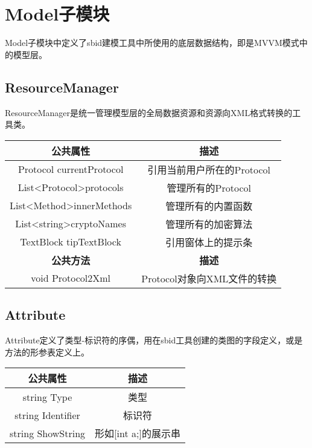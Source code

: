 \chapter{Model子模块}
Model子模块中定义了sbid建模工具中所使用的底层数据结构，即是MVVM模式中的模型层。
\section{ResourceManager}
ResourceManager是统一管理模型层的全局数据资源和资源向XML格式转换的工具类。
\begin{table}[h]
	\centering
	\begin{tabular}{|c|c|}
		\hline
		\textbf{公共属性}                                  & \textbf{描述}         \\ \hline
		Protocol currentProtocol                       & 引用当前用户所在的Protocol   \\ \hline
		List\textless{}Protocol\textgreater protocols  & 管理所有的Protocol       \\ \hline
		List\textless{}Method\textgreater innerMethods & 管理所有的内置函数           \\ \hline
		List\textless{}string\textgreater cryptoNames  & 管理所有的加密算法           \\ \hline
		TextBlock tipTextBlock                         & 引用窗体上的提示条           \\ \hline
		\textbf{公共方法}                                  & \textbf{描述}         \\ \hline
		void Protocol2Xml                       & Protocol对象向XML文件的转换 \\ \hline
	\end{tabular}
\end{table}

\section{Attribute}
Attribute定义了类型-标识符的序偶，用在sbid工具创建的类图的字段定义，或是方法的形参表定义上。
\begin{table}[h]
	\centering
	\begin{tabular}{|c|c|}
		\hline
		\textbf{公共属性}     & \textbf{描述}    \\ \hline
		string Type       & 类型             \\ \hline
		string Identifier & 标识符            \\ \hline
		string ShowString & 形如[int a;]的展示串 \\ \hline
	\end{tabular}
\end{table}

